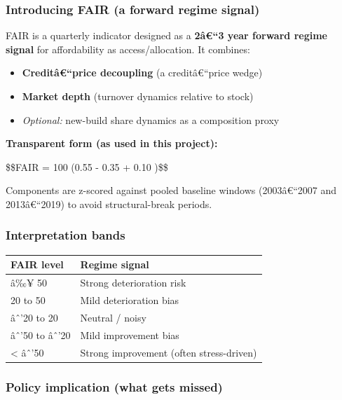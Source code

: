 \subsubsection{Introducing FAIR (a forward regime
signal)}\label{introducing-fair-a-forward-regime-signal}

FAIR is a quarterly indicator designed as a \textbf{2â€``3 year forward
regime signal} for affordability as access/allocation. It combines:

\begin{itemize}
\tightlist
\item
  \textbf{Creditâ€``price decoupling} (a creditâ€``price wedge)
\item
  \textbf{Market depth} (turnover dynamics relative to stock)
\item
  \emph{Optional:} new-build share dynamics as a composition proxy
\end{itemize}

\textbf{Transparent form (as used in this project):}

\$\$FAIR = 100 \times (0.55 \times {} - 0.35
\times {} + 0.10
\times \Delta{})\$\$

Components are z-scored against pooled baseline windows (2003â€``2007
and 2013â€``2019) to avoid structural-break periods.

\subsubsection{Interpretation bands}\label{interpretation-bands}

{\def\LTcaptype{none} %
\begin{longtable}[]{@{}ll@{}}
\toprule\noalign{}
FAIR level & Regime signal \\
\midrule\noalign{}
\endhead
\bottomrule\noalign{}
\endlastfoot
â‰¥ 50 & Strong deterioration risk \\
20 to 50 & Mild deterioration bias \\
âˆ'20 to 20 & Neutral / noisy \\
âˆ'50 to âˆ'20 & Mild improvement bias \\
\textless{} âˆ'50 & Strong improvement (often stress-driven) \\
\end{longtable}
}

\subsubsection{Policy implication (what gets
missed)}\label{policy-implication-what-gets-missed}

